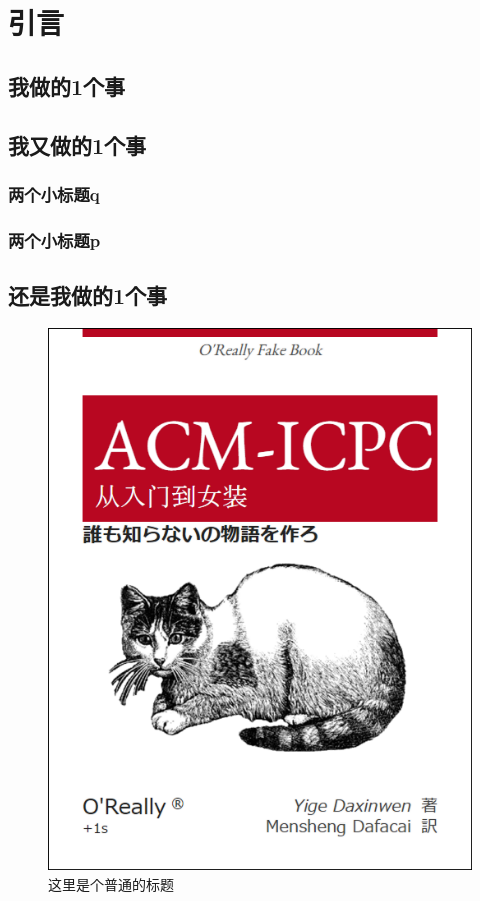 \chapter{引言}
\blindtext\cite{NWPUThesisLaTeXTemplate}
\section{我做的1个事}
\blindtext\cite{knuth1986the}\cite{lamport1989latex:}
\section{我又做的1个事}
\blindtext
\subsection{两个小标题q}
\blindtext
\subsection{两个小标题p}
\blindtext
\section{还是我做的1个事}
\blindtext
\begin{figure}[ht]
    \centering
    \includegraphics[scale=0.6]{figures/figure1.png}
    \caption{
        这里是个普通的标题
    }
    \label{fig:example}
\end{figure}
\endinput